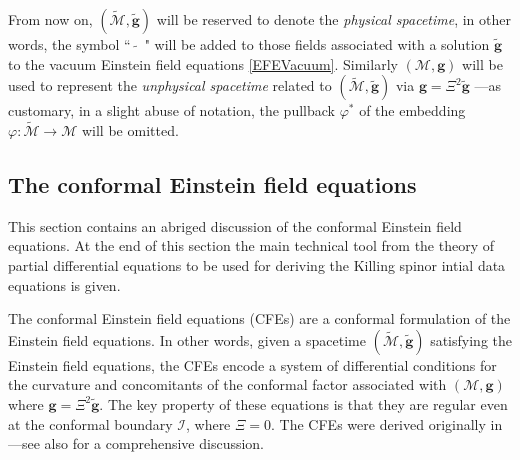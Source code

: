 \documentclass[10pt,a4paper]{article}
\theoremstyle{plain}
\def\bmg{{\bm g}}
\begin{document}
From now on, $(\tilde{\mathcal{M}},\tilde{\bmg})$ will be reserved to
denote the \emph{physical spacetime}, in other words, the symbol
``$\tilde{ \quad}$" will be added to those fields associated with a
solution $\tilde{\bmg}$ to the vacuum Einstein field equations
\eqref{EFEVacuum}.  Similarly $(\mathcal{M},\bmg)$ will be used to
represent the \emph{unphysical spacetime} related to
$(\tilde{\mathcal{M}},\tilde{\bmg})$ via $\bmg=\Xi^2\tilde{\bmg}$
---as customary, in a slight abuse of notation, the pullback $\varphi^*$ of the
 embedding
$\varphi:
\tilde{\mathcal{M}}\rightarrow\mathcal{M}$ will be omitted.



\subsection{The conformal Einstein field equations}
\label{Sec:CFEs}

This section contains an abriged discussion of the conformal Einstein
field equations.  At the end of this section the main technical
tool from the theory of partial
differential equations to be used for deriving the Killing spinor
intial data equations is given.

\medskip
 

The conformal Einstein field equations (CFEs) are a conformal
formulation of the Einstein field equations. In other words, given a
spacetime $(\tilde{\mathcal{M}},\tilde{\bmg})$ satisfying the Einstein
field equations, the CFEs
encode a system of differential conditions for the curvature and
concomitants of the conformal factor associated with
$(\mathcal{M},\bmg)$ where $\bmg=\Xi^2\tilde{\bmg}$. The key property
of these equations is that they are regular even at the conformal
boundary $\mathscr{I}$, where $\Xi=0$.  The CFEs were derived originally
in \cite{Fri81a} ---see also \cite{CFEbook} for a
comprehensive discussion.


\medskip
\end{document}
